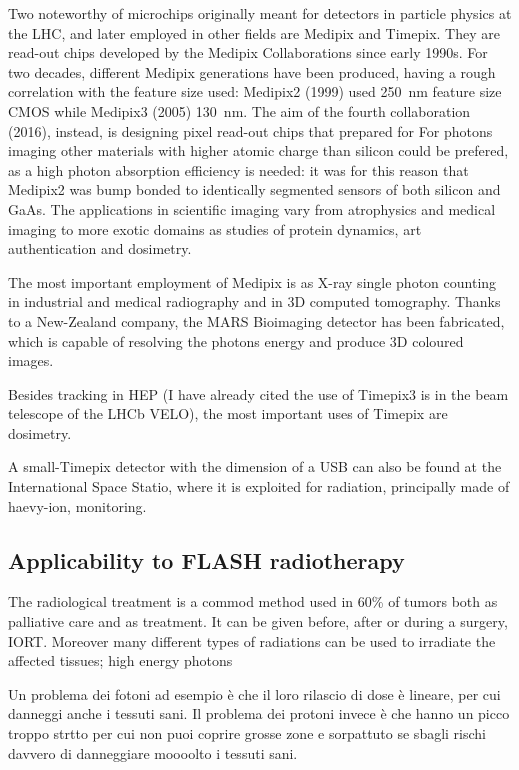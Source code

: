     Two noteworthy of microchips originally meant
    for detectors in particle physics at the LHC, and later employed in other fields are Medipix and Timepix. They are read-out chips developed by the Medipix Collaborations since early 1990s. For two decades, different Medipix generations have been produced, having a rough correlation with the feature size used: Medipix2 (1999) used \SI{250}{nm} feature size CMOS while Medipix3 (2005) \SI{130}{nm}.
    The aim of the fourth collaboration (2016), instead, is designing pixel read-out chips that prepared for 
    For photons imaging other materials with higher atomic charge than silicon could be prefered, as a high photon absorption efficiency is needed: it was for this reason that Medipix2 was bump bonded to identically segmented sensors of both silicon and GaAs.
    The applications in scientific imaging vary from atrophysics and medical imaging to more exotic domains as studies of protein dynamics, art authentication and dosimetry.

    The most important employment of Medipix is as X-ray single photon counting in industrial and medical radiography and in 3D computed tomography. 
    Thanks to a New-Zealand company, the MARS Bioimaging detector has been fabricated, which is capable of resolving the photons energy and produce 3D coloured images.

    Besides tracking in HEP (I have already cited the use of Timepix3 is in the beam telescope of the LHCb VELO), the most important uses of Timepix are dosimetry.  

    A small-Timepix detector with the dimension of a USB can also be found at the International Space Statio, where it is exploited for radiation, principally made of haevy-ion, monitoring. 
    
 
    \subsection{Applicability to FLASH radiotherapy}
        The radiological treatment is a commod method used in 60\% of tumors both as palliative care and as treatment. It can be given before, after or during a surgery,  IORT. 
        Moreover many different types of radiations can be used to irradiate the affected tissues; high energy photons 

    Un problema dei fotoni ad esempio è che il loro rilascio di dose è lineare, per cui danneggi anche i tessuti sani. Il problema dei protoni invece è che hanno un picco troppo strtto per cui non puoi coprire grosse zone e sorpattuto se sbagli rischi davvero di danneggiare moooolto i tessuti sani.\\


